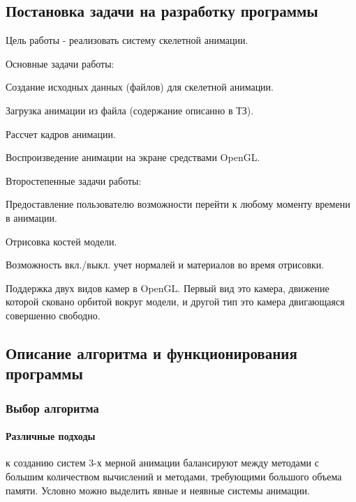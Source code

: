 \subsection{Постановка задачи на разработку программы}
    Цель работы - реализовать систему скелетной анимации.

\bigskip
Основные задачи работы:

\smallskip
\begin{my_enumerate}
\item Создание исходных данных (файлов) для скелетной анимации.
\item Загрузка анимации из файла (содержание описанно в ТЗ).
\item Рассчет кадров анимации.
\item Воспроизведение анимации на экране средствами OpenGL.
\end{my_enumerate}

Второстепенные задачи работы:
\begin{my_enumerate}
\item Предоставление пользователю возможности перейти к любому моменту времени в анимации.
\item Отрисовка костей модели.
\item Возможность вкл./выкл. учет нормалей и материалов во время отрисовки.
\item Поддержка двух видов камер в OpenGL. Первый вид это камера, движение которой сковано орбитой вокруг модели, и другой тип это камера двигающаяся совершенно свободно.
\end{my_enumerate}


\subsection{Описание алгоритма и функционирования программы}


\subsubsection{Выбор алгоритма}

\paragraph{Различные подходы}
к созданию систем 3-х мерной анимации балансируют между методами с большим количеством вычислений и методами, требующими большого объема памяти. Условно можно выделить явные и неявные системы анимации.

